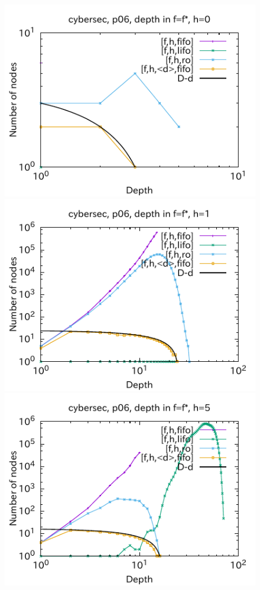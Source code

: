 \begin{figure}[htbp]
\includegraphics{img/output-lmcut/cybersec/p06-0.pdf}
\includegraphics{img/output-lmcut/cybersec/p06-1.pdf}
\includegraphics{img/output-lmcut/cybersec/p06-5.pdf}

\end{figure}
